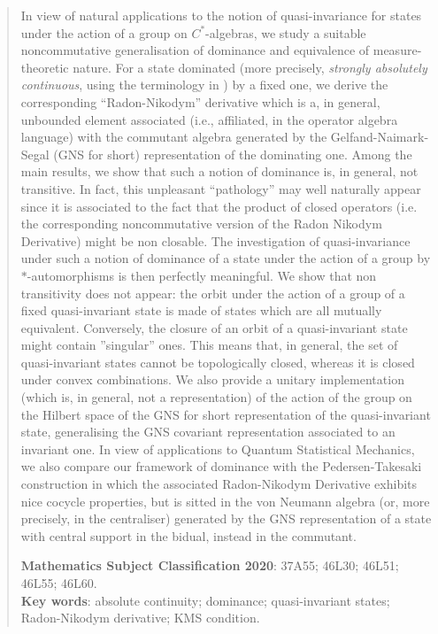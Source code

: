 \documentclass[12pt]{amsart}
\numberwithin{equation}{section}
\begin{document}
\begin{abstract}
In view of natural applications to the notion of quasi-invariance for states under the action of a group on $C^*$-algebras, we study a suitable noncommutative generalisation of dominance and equivalence of measure-theoretic nature. For a state dominated (more precisely, {\it strongly absolutely continuous}, using the terminology in \cite{G})
by a fixed one, we derive the corresponding ``Radon-Nikodym'' derivative which is a, in general, unbounded element associated (i.e., affiliated, in the operator algebra language) with the commutant algebra generated by the Gelfand-Naimark-Segal (GNS for short) representation of the dominating one.
Among the main results, we show that such a notion of dominance is, in general, not transitive. In fact, this unpleasant ``pathology'' may well naturally appear since it is associated to the fact that the product of closed operators (i.e. the corresponding noncommutative version of the Radon Nikodym Derivative) might be non closable.
The investigation of quasi-invariance under such a notion of dominance of a state under the action of a group by $*$-automorphisms is then perfectly meaningful. We show that non transitivity does not appear: the orbit under the action of a group of a fixed quasi-invariant state is made of states which are all mutually equivalent. Conversely, the closure of an orbit of a quasi-invariant state might contain ''singular'' ones. This means that, in general,
the set of quasi-invariant states cannot be topologically closed, whereas it is closed under convex combinations.
We also provide a unitary implementation (which is, in general, not a representation) of the action of the group on the Hilbert space of the GNS for short representation of the quasi-invariant state, generalising the GNS covariant representation associated to an invariant one. In view of applications to Quantum Statistical Mechanics, we also compare our framework of dominance with the Pedersen-Takesaki construction in which the associated Radon-Nikodym Derivative exhibits nice cocycle properties, but is sitted in the von Neumann algebra (or, more precisely, in the centraliser) generated by the GNS representation of a state with central support in the bidual, instead in the commutant. 

\noindent
{\bf Mathematics Subject Classification 2020}: 37A55; 46L30; 46L51; 46L55; 46L60.\\
{\bf Key words}: absolute continuity; dominance; quasi-invariant states; Radon-Nikodym derivative; KMS condition.\\
\end{abstract}
\end{document}
